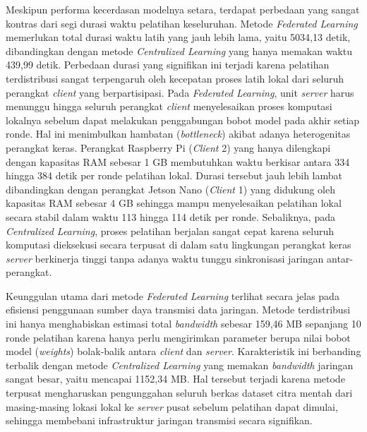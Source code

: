 Meskipun performa kecerdasan modelnya setara, terdapat perbedaan yang sangat kontras dari segi durasi waktu pelatihan keseluruhan. Metode \textit{Federated Learning} memerlukan total durasi waktu latih yang jauh lebih lama, yaitu 5034,13 detik, dibandingkan dengan metode \textit{Centralized Learning} yang hanya memakan waktu 439,99 detik. Perbedaan durasi yang signifikan ini terjadi karena pelatihan terdistribusi sangat terpengaruh oleh kecepatan proses latih lokal dari seluruh perangkat \textit{client} yang berpartisipasi. Pada \textit{Federated Learning}, unit \textit{server} harus menunggu hingga seluruh perangkat \textit{client} menyelesaikan proses komputasi lokalnya sebelum dapat melakukan penggabungan bobot model pada akhir setiap ronde. Hal ini menimbulkan hambatan (\textit{bottleneck}) akibat adanya heterogenitas perangkat keras. Perangkat Raspberry Pi (\textit{Client} 2) yang hanya dilengkapi dengan kapasitas RAM sebesar 1 GB membutuhkan waktu berkisar antara 334 hingga 384 detik per ronde pelatihan lokal. Durasi tersebut jauh lebih lambat dibandingkan dengan perangkat Jetson Nano (\textit{Client} 1) yang didukung oleh kapasitas RAM sebesar 4 GB sehingga mampu menyelesaikan pelatihan lokal secara stabil dalam waktu 113 hingga 114 detik per ronde. Sebaliknya, pada \textit{Centralized Learning}, proses pelatihan berjalan sangat cepat karena seluruh komputasi dieksekusi secara terpusat di dalam satu lingkungan perangkat keras \textit{server} berkinerja tinggi tanpa adanya waktu tunggu sinkronisasi jaringan antar-perangkat.

Keunggulan utama dari metode \textit{Federated Learning} terlihat secara jelas pada efisiensi penggunaan sumber daya transmisi data jaringan. Metode terdistribusi ini hanya menghabiskan estimasi total \textit{bandwidth} sebesar 159,46 MB sepanjang 10 ronde pelatihan karena hanya perlu mengirimkan parameter berupa nilai bobot model (\textit{weights}) bolak-balik antara \textit{client} dan \textit{server}. Karakteristik ini berbanding terbalik dengan metode \textit{Centralized Learning} yang memakan \textit{bandwidth} jaringan sangat besar, yaitu mencapai 1152,34 MB. Hal tersebut terjadi karena metode terpusat mengharuskan pengunggahan seluruh berkas dataset citra mentah dari masing-masing lokasi lokal ke \textit{server} pusat sebelum pelatihan dapat dimulai, sehingga membebani infrastruktur jaringan transmisi secara signifikan.

